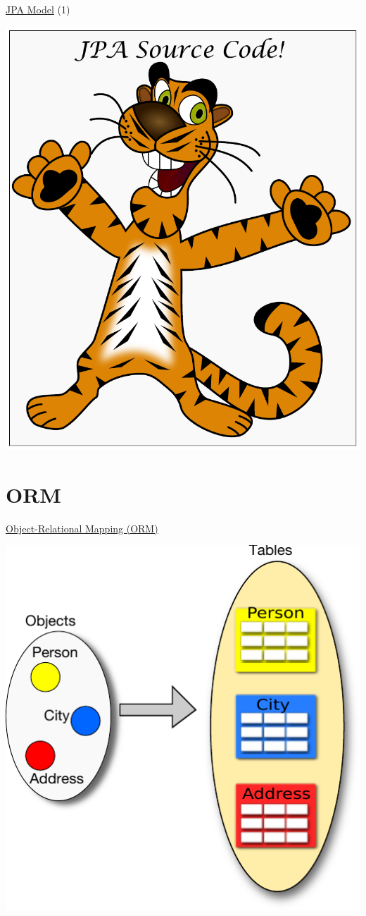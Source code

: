 \documentclass[xcolor=x11names,compress]{beamer}
\renewcommand{\(}{\begin{columns}}
\renewcommand{\)}{\end{columns}}
\newcommand{\<}[1]{\begin{column}{#1}}
\renewcommand{\>}{\end{column}}
\begin{document}
\begin{frame}{\underline{JPA Model} (1)}
\justifying


\begin{center}
\includegraphics[keepaspectratio,width=.5\textwidth]{Happy-Tiger}


\end{center}
\end{frame}

\section{\scshape ORM}
\begin{frame}{\underline{Object-Relational Mapping (ORM)}}

\begin{center}
\includegraphics[keepaspectratio,width=.65\textwidth]{objectToTable}

\end{center}

\end{frame}
\end{document}
